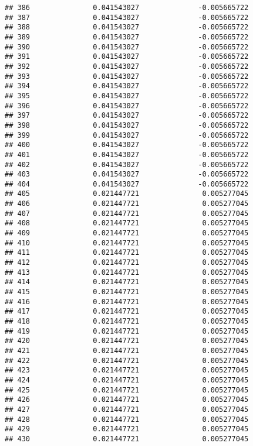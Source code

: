 \documentclass[]{article}
\begin{document}
\begin{verbatim}
## 386               0.041543027              -0.005665722
## 387               0.041543027              -0.005665722
## 388               0.041543027              -0.005665722
## 389               0.041543027              -0.005665722
## 390               0.041543027              -0.005665722
## 391               0.041543027              -0.005665722
## 392               0.041543027              -0.005665722
## 393               0.041543027              -0.005665722
## 394               0.041543027              -0.005665722
## 395               0.041543027              -0.005665722
## 396               0.041543027              -0.005665722
## 397               0.041543027              -0.005665722
## 398               0.041543027              -0.005665722
## 399               0.041543027              -0.005665722
## 400               0.041543027              -0.005665722
## 401               0.041543027              -0.005665722
## 402               0.041543027              -0.005665722
## 403               0.041543027              -0.005665722
## 404               0.041543027              -0.005665722
## 405               0.021447721               0.005277045
## 406               0.021447721               0.005277045
## 407               0.021447721               0.005277045
## 408               0.021447721               0.005277045
## 409               0.021447721               0.005277045
## 410               0.021447721               0.005277045
## 411               0.021447721               0.005277045
## 412               0.021447721               0.005277045
## 413               0.021447721               0.005277045
## 414               0.021447721               0.005277045
## 415               0.021447721               0.005277045
## 416               0.021447721               0.005277045
## 417               0.021447721               0.005277045
## 418               0.021447721               0.005277045
## 419               0.021447721               0.005277045
## 420               0.021447721               0.005277045
## 421               0.021447721               0.005277045
## 422               0.021447721               0.005277045
## 423               0.021447721               0.005277045
## 424               0.021447721               0.005277045
## 425               0.021447721               0.005277045
## 426               0.021447721               0.005277045
## 427               0.021447721               0.005277045
## 428               0.021447721               0.005277045
## 429               0.021447721               0.005277045
## 430               0.021447721               0.005277045

\end{verbatim}
\end{document}
